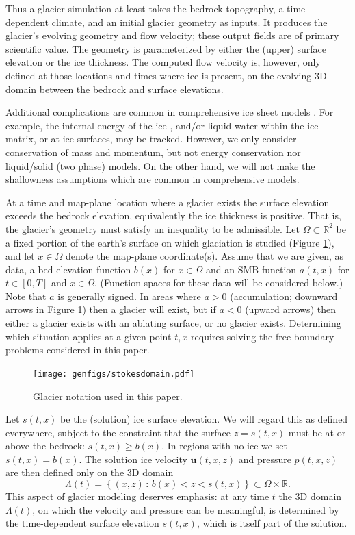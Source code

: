 \documentclass[hidelinks,onefignum,onetabnum,final]{siamart220329}  %
\newcommand{\RR}{\mathbb{R}}
\newcommand{\bu}{\mathbf{u}}
\begin{document}
Thus a glacier simulation at least takes the bedrock topography, a time-dependent climate, and an initial glacier geometry as inputs.  It produces the glacier's evolving geometry and flow velocity; these output fields are of primary scientific value.  The geometry is parameterized by either the (upper) surface elevation or the ice thickness.  The computed flow velocity is, however, only defined at those locations and times where ice is present, on the evolving 3D domain between the bedrock and surface elevations.

Additional complications are common in comprehensive ice sheet models \cite{SchoofHewitt2013}.  For example, the internal energy of the ice \cite{Aschwandenetal2012}, and/or liquid water within the ice matrix, or at ice surfaces, may be tracked.  However, we only consider conservation of mass and momentum, but not energy conservation nor liquid/solid (two phase) models.  On the other hand, we will not make the shallowness assumptions which are common in comprehensive models.

At a time and map-plane location where a glacier exists the surface elevation exceeds the bedrock elevation, equivalently the ice thickness is positive.  That is, the glacier's geometry must satisfy an inequality to be admissible.  Let $\Omega \subset \RR^2$ be a fixed portion of the earth's surface on which glaciation is studied (Figure \ref{fig:stokesdomain}), and let $x\in\Omega$ denote the map-plane coordinate(s).  Assume that we are given, as data, a bed elevation function $b(x)$ for $x\in\Omega$ and an SMB function $a(t,x)$ for $t\in [0,T]$ and $x\in \Omega$.  (Function spaces for these data will be considered below.)  Note that $a$ is generally signed.  In areas where $a>0$ (accumulation; downward arrows in Figure \ref{fig:stokesdomain}) then a glacier will exist, but if $a<0$ (upward arrows) then either a glacier exists with an ablating surface, or no glacier exists.  Determining which situation applies at a given point $t,x$ requires solving the free-boundary problems considered in this paper.

\medskip
\begin{figure}[ht]
\centering
\texttt{[image: genfigs/stokesdomain.pdf]}
\caption{Glacier notation used in this paper.}
\label{fig:stokesdomain}
\end{figure}

\medskip
Let $s(t,x)$ be the (solution) ice surface elevation.  We will regard this as defined everywhere, subject to the constraint that the surface $z=s(t,x)$ must be at or above the bedrock: $s(t,x) \ge b(x)$.  In regions with no ice we set $s(t,x)=b(x)$.  The solution ice velocity $\bu(t,x,z)$ and pressure $p(t,x,z)$ are then defined only on the 3D domain
\begin{equation}
\Lambda(t) = \left\{(x,z)\,:\,b(x) < z < s(t,x)\right\} \subset \Omega \times \RR. \label{eq:icydomain}
\end{equation}
This aspect of glacier modeling deserves emphasis: at any time $t$ the 3D domain $\Lambda(t)$, on which the velocity and pressure can be meaningful, is determined by the time-dependent surface elevation $s(t,x)$, which is itself part of the solution.
\end{document}
